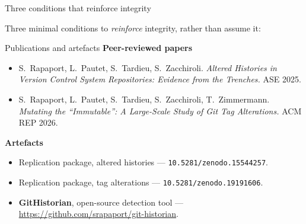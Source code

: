 \documentclass[aspectratio=169]{beamer}
\newcommand{\srcnote}[1]{%
  \vfill
  \begingroup
    \scriptsize\color{black!55}%
    \parbox{0.86\linewidth}{\raggedright\textsuperscript{1}~#1}\par
  \endgroup
}
\begin{document}
\begin{frame}{Three conditions that reinforce integrity}

    Three minimal conditions to \emph{reinforce} integrity, rather than assume it:
    \vspace{0.4em}
    \begin{center}
    \end{center}
\end{frame}

\begin{frame}{Publications and artefacts}
    \begingroup\small
    \textbf{Peer-reviewed papers}
    \begin{itemize}\setlength{\itemsep}{0.25em}
        \item S.~Rapaport, L.~Pautet, S.~Tardieu, S.~Zacchiroli.
              \emph{Altered Histories in Version Control System Repositories: Evidence from
              the Trenches.} ASE 2025.
        \item S.~Rapaport, L.~Pautet, S.~Tardieu, S.~Zacchiroli, T.~Zimmermann.
              \emph{Mutating the ``Immutable'': A Large-Scale Study of Git Tag Alterations.}
              ACM REP 2026.
    \end{itemize}
    \vspace{0.4em}
    \textbf{Artefacts}
    \begin{itemize}\setlength{\itemsep}{0.25em}
        \item Replication package, altered histories
              --- \texttt{10.5281/zenodo.15544257}.
        \item Replication package, tag alterations
              --- \texttt{10.5281/zenodo.19191606}.
        \item \textbf{GitHistorian}, open-source detection tool ---
              \url{https://github.com/srapaport/git-historian}.
    \end{itemize}
    \endgroup
\end{frame}
\end{document}

